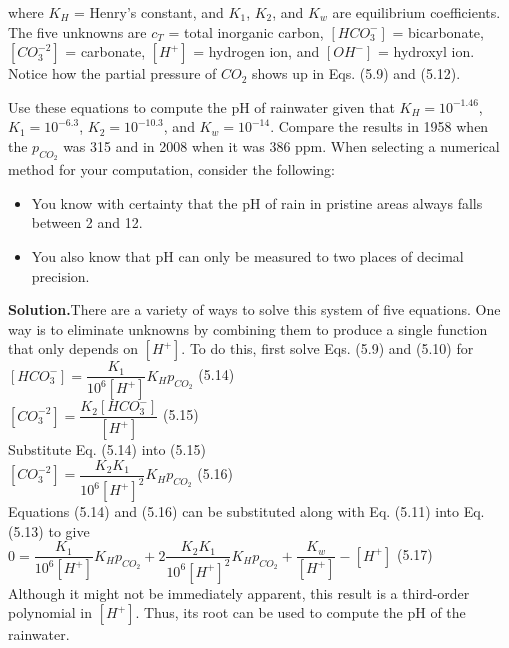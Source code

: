 \documentclass[../main.tex]{subfiles}
\begin{document}
\noindent where $K_H$ = Henry's constant, and $K_1$, $K_2$, and $K_w$ are equilibrium coefficients. The five
unknowns are $c_T$ = total inorganic carbon, $[HCO^-_3 ]$ = bicarbonate, $[CO^{-2}_3 ]$ = carbonate,
$[H^+]$ = hydrogen ion, and $[OH^-]$ = hydroxyl ion. Notice how the partial pressure of $CO_2$
shows up in Eqs. (5.9) and (5.12).

Use these equations to compute the pH of rainwater given that $K_H =10^{-1.46}$,
 $K_1 = 10^{-6.3}$, $K_2 = 10^{-10.3}$, and $K_w = 10^{-14}$. Compare the results in 1958 when
the $p_{CO_2}$ was 315 and in 2008 when it was 386 ppm. When selecting a numerical method
for your computation, consider the following:

\begin{itemize}
    \item You know with certainty that the pH of rain in pristine areas always falls between 2
    and 12.
    \item You also know that pH can only be measured to two places of decimal precision.
\end{itemize}

\noindent\textbf{Solution.}\quad There are a variety of ways to solve this system of five equations. One way
is to eliminate unknowns by combining them to produce a single function that only depends
on $[H^+]$. To do this, first solve Eqs. (5.9) and (5.10) for\\

$[HCO^-_3]=\dfrac{K_1}{10^6[H^+]}K_H p_{CO_2}$
\hfill (5.14)\\

$[CO^{-2}_3]=\dfrac{K_2[HCO^-_3]}{[H^+]}$
\hfill (5.15)\\

\noindent Substitute Eq. (5.14) into (5.15)\\

$[CO^{-2}_3]=\dfrac{K_2K_1}{10^6[H^+]^2}K_Hp_{CO_2}$
\hfill (5.16)\\

\noindent Equations (5.14) and (5.16) can be substituted along with Eq. (5.11) into Eq. (5.13) to give\\

$0=\dfrac{K_1}{10^6[H^+]}K_H p_{CO_2} + 2\dfrac{K_2K_1}{10^6[H^+]^2}K_Hp_{CO_2} + \dfrac{K_w}{[H^+]}-[H^+]$
\hfill (5.17)\\

\noindent Although it might not be immediately apparent, this result is a third-order polynomial in
$[H^+]$. Thus, its root can be used to compute the pH of the rainwater.
\end{document}
